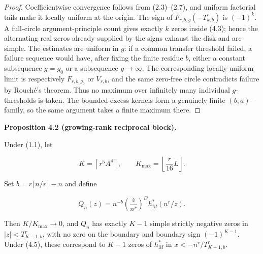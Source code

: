 \documentclass[10pt]{article}
\newenvironment{mdstatement}[1]
  {\par\Needspace{0.16\textheight}\noindent\textbf{#1.}\ \itshape}
  {\par\normalfont}
\begin{document}
\begin{proof}


Coefficientwise convergence follows from (2.3)--(2.7), and uniform factorial
tails make it locally uniform at the origin.  The sign of
$F_{r,b,g}(-T_{k,b}^r)$ is $(-1)^k$.  A full-circle argument-principle
count gives exactly $k$ zeros inside (4.3); hence the alternating real zeros
already supplied by the signs exhaust the disk and are simple.  The estimates
are uniform in $g$: if a common transfer threshold failed, a failure sequence
would have, after fixing the finite residue $b$, either a constant subsequence
$g=g_0$ or a subsequence $g\to\infty$.  The corresponding locally uniform
limit is respectively $F_{r,b,g_0}$ or $V_{r,b}$, and the same zero-free
circle contradicts failure by Rouché's theorem.  Thus no maximum over infinitely
many individual $g$-thresholds is taken.  The bounded-excess kernels form a
genuinely finite $(b,a)$-family, so the same argument takes a finite maximum
there.
\end{proof}


\begin{mdstatement}{Proposition 4.2 (growing-rank reciprocal block)}


Under (1.1), let

\[
 K=\left\lceil r^5A^4\right\rceil,
 \qquad K_{\max}=\left\lfloor\frac r{16}L\right\rfloor. \tag{4.4}
\]

Set $b=r\lceil n/r\rceil-n$ and define

\[
 Q_n(z)=n^{-b}\left(\frac z{n^r}\right)^D h_M^*(n^r/z). \tag{4.5}
\]

Then $K/K_{\max}\to0$, and $Q_n$ has exactly $K-1$
simple strictly negative zeros in $|z|<T_{K-1,b}^r$, with no zero on the
boundary and boundary sign $(-1)^{K-1}$.  Under (4.5), these correspond to
$K-1$ zeros of $h_M^*$ in
$x<-n^r/T_{K-1,b}^r$.

\end{mdstatement}
\end{document}
